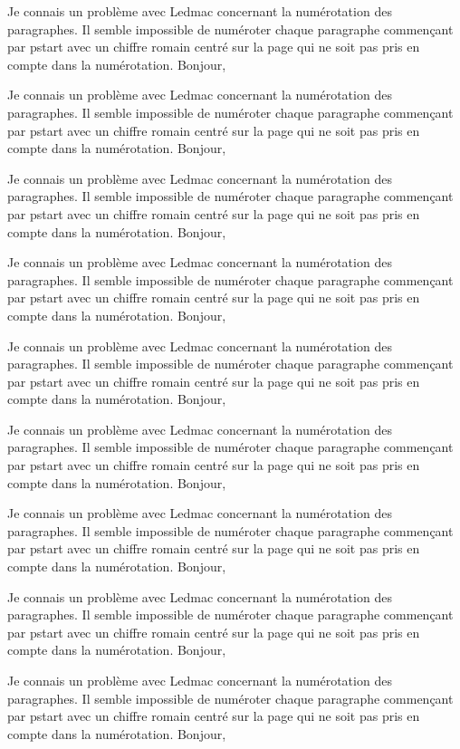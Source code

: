 \documentclass{article}
\begin{document}
Je connais un problème avec Ledmac concernant la numérotation des paragraphes. Il semble impossible de numéroter chaque paragraphe commençant par pstart avec un chiffre romain centré sur la page qui ne soit pas pris en compte dans la numérotation.\pend
\pstart Bonjour,

Je connais un problème avec Ledmac concernant la numérotation des paragraphes. Il semble impossible de numéroter chaque paragraphe commençant par pstart avec un chiffre romain centré sur la page qui ne soit pas pris en compte dans la numérotation.\pend
\pstart Bonjour,

Je connais un problème avec Ledmac concernant la numérotation des paragraphes. Il semble impossible de numéroter chaque paragraphe commençant par pstart avec un chiffre romain centré sur la page qui ne soit pas pris en compte dans la numérotation.\pend
\pstart Bonjour,

Je connais un problème avec Ledmac concernant la numérotation des paragraphes. Il semble impossible de numéroter chaque paragraphe commençant par pstart avec un chiffre romain centré sur la page qui ne soit pas pris en compte dans la numérotation.\pend
\pstart Bonjour,

Je connais un problème avec Ledmac concernant la numérotation des paragraphes. Il semble impossible de numéroter chaque paragraphe commençant par pstart avec un chiffre romain centré sur la page qui ne soit pas pris en compte dans la numérotation.\pend
\pstart Bonjour,

Je connais un problème avec Ledmac concernant la numérotation des paragraphes. Il semble impossible de numéroter chaque paragraphe commençant par pstart avec un chiffre romain centré sur la page qui ne soit pas pris en compte dans la numérotation.\pend
\pstart Bonjour,

Je connais un problème avec Ledmac concernant la numérotation des paragraphes. Il semble impossible de numéroter chaque paragraphe commençant par pstart avec un chiffre romain centré sur la page qui ne soit pas pris en compte dans la numérotation.\pend
\pstart Bonjour,

Je connais un problème avec Ledmac concernant la numérotation des paragraphes. Il semble impossible de numéroter chaque paragraphe commençant par pstart avec un chiffre romain centré sur la page qui ne soit pas pris en compte dans la numérotation.\pend
\pstart Bonjour,

Je connais un problème avec Ledmac concernant la numérotation des paragraphes. Il semble impossible de numéroter chaque paragraphe commençant par pstart avec un chiffre romain centré sur la page qui ne soit pas pris en compte dans la numérotation.\pend
\pstart Bonjour,
\end{document}
